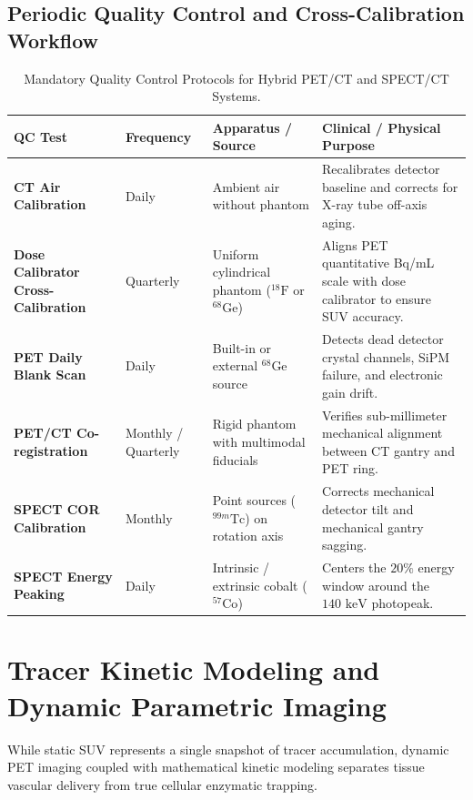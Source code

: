 \documentclass[11pt,a4paper]{article}
\begin{document}
\subsection{Periodic Quality Control and Cross-Calibration Workflow}
\begin{table}[htbp]
\centering
\small
\setlength{\tabcolsep}{3pt}
\caption{Mandatory Quality Control Protocols for Hybrid PET/CT and SPECT/CT Systems.}
\label{tab:qc_protocols}
\begin{tabular}{p{2.8cm} p{2.2cm} p{4.2cm} p{5.0cm}}
\toprule
\textbf{QC Test} & \textbf{Frequency} & \textbf{Apparatus / Source} & \textbf{Clinical / Physical Purpose} \\
\midrule
\textbf{CT Air Calibration} & Daily & Ambient air without phantom & Recalibrates detector baseline and corrects for X-ray tube off-axis aging. \\
\addlinespace
\textbf{Dose Calibrator Cross-Calibration} & Quarterly & Uniform cylindrical phantom ($^{18}\text{F}$ or $^{68}\text{Ge}$) & Aligns PET quantitative Bq/mL scale with dose calibrator to ensure SUV accuracy. \\
\addlinespace
\textbf{PET Daily Blank Scan} & Daily & Built-in or external $^{68}\text{Ge}$ source & Detects dead detector crystal channels, SiPM failure, and electronic gain drift. \\
\addlinespace
\textbf{PET/CT Co-registration} & Monthly / Quarterly & Rigid phantom with multimodal fiducials & Verifies sub-millimeter mechanical alignment between CT gantry and PET ring. \\
\addlinespace
\textbf{SPECT COR Calibration} & Monthly & Point sources ($^{99m}\text{Tc}$) on rotation axis & Corrects mechanical detector tilt and mechanical gantry sagging. \\
\addlinespace
\textbf{SPECT Energy Peaking} & Daily & Intrinsic / extrinsic cobalt ($^{57}\text{Co}$) & Centers the $20\%$ energy window around the $140\text{ keV}$ photopeak. \\
\bottomrule
\end{tabular}
\end{table}

\section{Tracer Kinetic Modeling and Dynamic Parametric Imaging}
While static SUV represents a single snapshot of tracer accumulation, dynamic PET imaging coupled with mathematical kinetic modeling separates tissue vascular delivery from true cellular enzymatic trapping.
\end{document}
